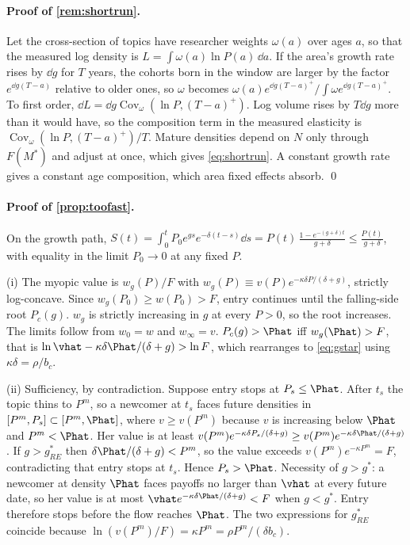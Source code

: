 \paragraph{Proof of \cref{rem:shortrun}.} Let the cross-section of topics have
researcher weights $\omega(a)$ over ages $a$, so that the measured log density is
$L=\int\omega(a)\ln P(a)\,\dd a$. If the area's growth rate rises by $\dd g$ for
$T$ years, the cohorts born in the window are larger by the factor
$e^{\dd g(T-a)}$ relative to older ones, so $\omega$ becomes
$\omega(a)e^{\dd g(T-a)^+}/\int\omega e^{\dd g(T-a)^+}$. To first order,
$\dd L=\dd g\operatorname{Cov}_\omega(\ln P,(T-a)^+)$. Log volume rises by
$T\dd g$ more than it would have, so the composition term in the measured
elasticity is $\operatorname{Cov}_\omega(\ln P,(T-a)^+)/T$. Mature densities
depend on $N$ only through $F(M^*)$ and adjust at once, which gives
\eqref{eq:shortrun}. A constant growth rate gives a constant age composition,
which area fixed effects absorb. \qed

\paragraph{Proof of \cref{prop:toofast}.} On the growth path,
$S(t)=\int_0^tP_0e^{gs}e^{-\delta(t-s)}\dd s=P(t)\,\frac{1-e^{-(g+\delta)t}}{g+\delta}\le\frac{P(t)}{g+\delta}$,
with equality in the limit $P_0\to0$ at any fixed $P$.

(i) The myopic value is $w_g(P)/F$ with $w_g(P)\equiv v(P)e^{-\kappa\delta P/(\delta+g)}$, strictly log-concave. Since $w_g(P_0)\ge w(P_0)>F$, entry continues until the falling-side root $P_c(g)$. $w_g$ is strictly increasing in $g$ at every $P>0$, so the root increases. The limits follow from $w_0=w$ and $w_\infty=v$. $P_c(g)>\Phat$ iff $w_g(\Phat)>F$, that is $\ln\vhat-\kappa\delta\Phat/(\delta+g)>\ln F$, which rearranges to \eqref{eq:gstar} using $\kappa\delta=\rho/b_c$.

(ii) Sufficiency, by contradiction. Suppose entry stops at $P_s\le\Phat$. After $t_s$ the topic thins to $P^m$, so a newcomer at $t_s$ faces future densities in $[P^m,P_s]\subset[P^m,\Phat]$, where $v\ge v(P^m)$ because $v$ is increasing below $\Phat$ and $P^m<\Phat$. Her value is at least $v(P^m)e^{-\kappa\delta P_s/(\delta+g)}\ge v(P^m)e^{-\kappa\delta\Phat/(\delta+g)}$. If $g>g^*_{RE}$ then $\delta\Phat/(\delta+g)<P^m$, so the value exceeds $v(P^m)e^{-\kappa P^m}=F$, contradicting that entry stops at $t_s$. Hence $P_s>\Phat$. Necessity of $g>g^*$: a newcomer at density $\Phat$ faces payoffs no larger than $\vhat$ at every future date, so her value is at most $\vhat e^{-\kappa\delta\Phat/(\delta+g)}<F$ when $g<g^*$. Entry therefore stops before the flow reaches $\Phat$. The two expressions for $g^*_{RE}$ coincide because $\ln(v(P^m)/F)=\kappa P^m=\rho P^m/(\delta b_c)$.

